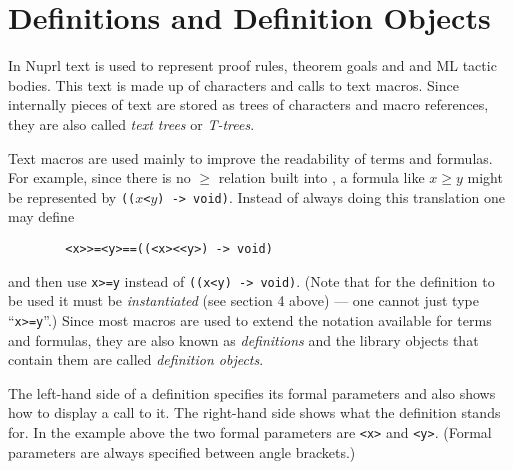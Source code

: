 \chapter{Definitions and Definition Objects}

In{} Nuprl text is used to represent proof rules, theorem goals and
and ML tactic bodies.
This text is made up of characters and calls to text macros.
Since internally pieces of text are stored as trees of characters and
macro references, they are also called {\em text{} trees}
or {\em T-trees}{}.

Text macros{} are used mainly to improve the readability of terms and
formulas.
For example, since there is no $\geq$ relation built into \prl{},
a formula like \(x \geq y\) might be represented by {\tt (($x$<$y$) -> void)}.
Instead of always doing this translation one may define
\begin{verbatim}
        <x>>=<y>==((<x><<y>) -> void)
\end{verbatim}
and then use {\tt x>=y} instead of {\tt ((x<y) -> void)}.
(Note that for the definition  to be used it must be {\em instantiated} 
(see section 4 above) --- one cannot just type ``{\tt x>=y}''.)
Since most macros are used to extend
the notation available for terms and formulas, they are also known as
{\em definitions}
and the library objects that contain them are called
{\em definition objects}.

The left-hand side of a definition specifies its formal parameters and also
shows how to display a call to it.
The right-hand side shows what the definition stands for.
In the example above the two formal parameters are {\tt <x>} and {\tt <y>}.
(Formal parameters are always specified between angle brackets.)

